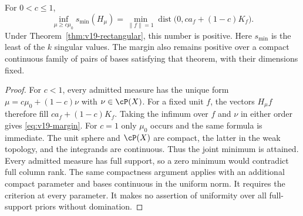 \begin{proposition}
\label{prop:v19-dominated-margin}
For $0<c\le1$,
\begin{equation}\label{eq:v19-margin}
 \inf_{\mu\ge c\mu_0}s_{\min}(H_\mu)
 =\min_{\|f\|=1}\operatorname{dist}
                 \bigl(0,c a_f+(1-c)K_f\bigr).
\end{equation}
Under Theorem~\ref{thm:v19-rectangular}, this number is positive.
Here $s_{\min}$ is the least of the $k$ singular values. The margin
also remains positive over a compact continuous family of pairs of
bases satisfying that theorem, with their dimensions fixed.
\end{proposition}
\begin{proof}
For $c<1$, every admitted measure has the unique form
$\mu=c\mu_0+(1-c)\nu$ with $\nu\in\cP(X)$. For a fixed unit $f$,
the vectors $H_\mu f$ therefore fill $c a_f+(1-c)K_f$.
Taking the infimum over $f$ and $\nu$ in either order gives
\eqref{eq:v19-margin}. For $c=1$ only $\mu_0$ occurs and the same
formula is immediate. The unit sphere and $\cP(X)$ are compact,
the latter in the weak topology, and the integrands are continuous.
Thus the joint minimum is attained. Every admitted measure has full
support, so a zero minimum would contradict full column rank.
The same compactness argument applies with an additional compact
parameter and bases continuous in the uniform norm. It requires the
criterion at every parameter. It makes no assertion of uniformity over
all full-support priors without domination.
\end{proof}

